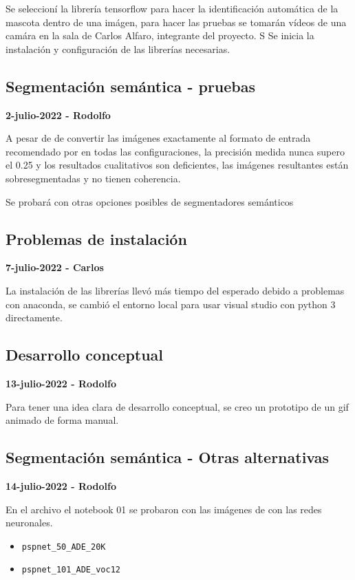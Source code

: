 Se seleccioní la librería tensorflow para hacer la identificación automática de la mascota dentro de una imágen, para hacer las pruebas se tomarán vídeos de una camára en la sala de Carlos Alfaro, integrante del proyecto. S
Se inicia la instalación y configuración de las librerías necesarias.

\subsection*{Segmentación semántica - pruebas}

\textbf{2-julio-2022 - Rodolfo}

A pesar de de convertir las imágenes exactamente al formato de entrada recomendado por \textcite{gupta2022} en todas las configuraciones, la precisión medida nunca supero el 0.25 y los resultados cualitativos son  deficientes, las imágenes resultantes están sobresegmentadas y no tienen coherencia.

Se probará con otras opciones posibles de segmentadores semánticos


\subsection*{Problemas de instalación}

\textbf{7-julio-2022 - Carlos}

La instalación de las librerías llevó más tiempo del esperado debido a problemas con anaconda, se cambió el entorno local para usar visual studio con python 3 directamente.


\subsection*{Desarrollo conceptual}


\textbf{13-julio-2022 - Rodolfo}

Para tener una idea clara de desarrollo conceptual, se creo un prototipo de un gif animado de forma manual.

\subsection*{Segmentación semántica - Otras alternativas}

\textbf{14-julio-2022 - Rodolfo}

En el archivo el notebook 01 se probaron con las imágenes de \textcite{unity2022} con las redes neuronales.

\begin{itemize}
    \item \texttt{pspnet\_50\_ADE\_20K}
    \item \texttt{pspnet\_101\_ADE\_voc12}
\end{itemize}

